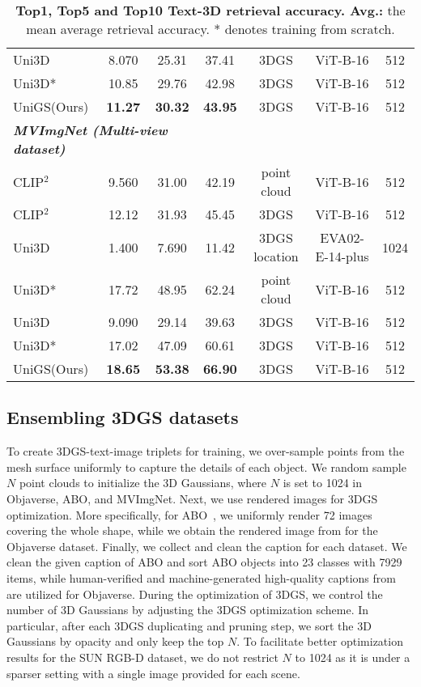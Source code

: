 \begin{table}[t]
\begin{tabularx}{\textwidth}{  l | c c c | c  |c  | c }
  Uni3D & 8.070 & 25.31 & 37.41 & 3DGS & ViT-B-16 & 512\\
 Uni3D* & 10.85 & 29.76 & 42.98 & 3DGS & ViT-B-16 & 512\\
 \midrule
 \rowcolor{mygray} UniGS(Ours) & \textbf{11.27} & \textbf{30.32} & \textbf{43.95} & 3DGS & ViT-B-16 & 512\\
%
 \midrule  \midrule
    \multicolumn{3}{l}{\textit{\textbf{MVImgNet (Multi-view dataset)}}} \\
    \midrule
 CLIP$^2$ & 9.560 & 31.00 & 42.19 & point cloud & ViT-B-16 & 512\\
 CLIP$^2$ & 12.12 & 31.93 & 45.45 & 3DGS & ViT-B-16 & 512\\
 Uni3D & 1.400 & 7.690 & 11.42 & 3DGS location & EVA02-E-14-plus & 1024\\
Uni3D* & 17.72 & 48.95 & 62.24 & point cloud & ViT-B-16 & 512\\
 Uni3D & 9.090 & 29.14 & 39.63 & 3DGS & ViT-B-16 & 512\\
 Uni3D* & 17.02 & 47.09 & 60.61 & 3DGS & ViT-B-16 & 512\\
 \midrule
 \rowcolor{mygray} UniGS(Ours) & \textbf{18.65} & \textbf{53.38} & \textbf{66.90} & 3DGS & ViT-B-16 & 512\\
\bottomrule
\end{tabularx}
		\caption{\textbf{Top1, Top5 and Top10 Text-3D retrieval accuracy. Avg.: }the mean average retrieval accuracy. * denotes training from scratch.}
  \label{tab:retrieve}
  \vspace{-5mm}
\end{table}

\vspace{-3mm}
\subsection{Ensembling 3DGS datasets}
\label{sec:E3D}
\vspace{-3mm}

To create 3DGS-text-image triplets for training, we over-sample points from the mesh surface uniformly to capture the details of each object. We random sample $N$ point clouds to initialize the 3D Gaussians, where $N$ is set to 1024 in Objaverse, ABO, and MVImgNet. 
%
Next, we use rendered images for 3DGS optimization. More specifically, for ABO~\citep{collins2022abo}, we uniformly render 72 images covering the whole shape, while we obtain the rendered image from \citep{liu2023zero} for the Objaverse dataset. Finally, we collect and clean the caption for each dataset. We clean the given caption of ABO and sort ABO objects into 23 classes with 7929 items, while human-verified and machine-generated high-quality captions from \citep{luo2024scalable, dong2024internlm} are utilized for Objaverse.
%
During the optimization of 3DGS, we control the number of 3D Gaussians by adjusting the 3DGS optimization scheme. In particular, after each 3DGS duplicating and pruning step, we sort the 3D Gaussians by opacity and only keep the top $N$. To facilitate better optimization results for the SUN RGB-D dataset, we do not restrict $N$ to 1024 as it is under a sparser setting with a single image provided for each scene.

